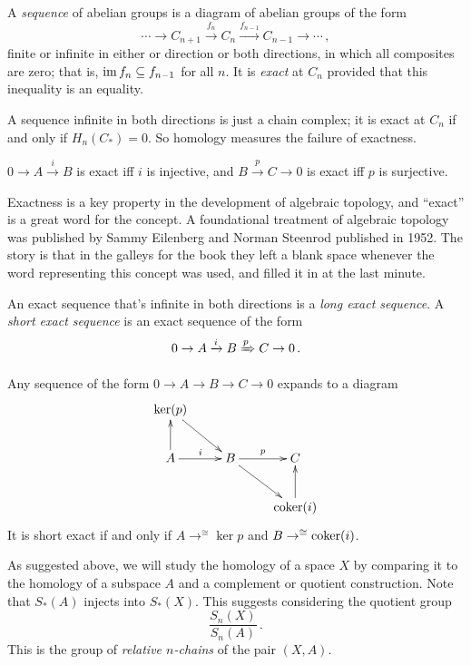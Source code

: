 \begin{definition}
A {\em sequence} of abelian groups is a diagram of abelian groups of the form 
\[
\cdots\rightarrow C_{n+1}\xrightarrow{f_n}C_n\xrightarrow{f_{n-1}}C_{n-1}
\rightarrow\cdots\,,
\]
finite or infinite in either or direction or both directions, in which all composites are zero; that is, $\operatorname{im} f_n\subseteq f_{n-1}$ for all $n$. It is 
{\em exact} at $C_n$ provided that this inequality is an equality. 
\end{definition}
\begin{example}
A sequence infinite in both directions is just a chain complex; it is exact at 
$C_n$ if and only if $H_n(C_\ast)=0$. So homology measures the failure of exactness.
\end{example}
\begin{example}
$0\to A\xrightarrow{i}B$ is exact iff $i$ is injective, and $B\xrightarrow{p}C\to 0$ is exact iff $p$ is surjective.
\end{example}
Exactness is a key property in the development of algebraic topology, and ``exact'' is a great word for the concept. A foundational treatment of algebraic topology was published by Sammy Eilenberg and Norman Steenrod published in 1952.
The story is that in the galleys for the book they left a blank space whenever the word representing this concept was used, and filled it in at the last minute. 
\begin{definition}
An exact sequence that's infinite in both directions
is a {\em long exact sequence}.
A {\em short exact sequence} is an exact sequence of the form 
\[
0\to A\xrightarrow{i}B\xRightarrow{p} C\to 0\,.
\]
\end{definition}

Any sequence of the form $0\to A\to B\to C\to0$ expands to a diagram
	\begin{equation*}
	\xymatrix{\ker(p) \ar[dr] & & \\
	A\ar[u]\ar[r]^i & B\ar[r]^p\ar[dr] & C\\
	 & & \coker(i)\ar[u]}
	\end{equation*}
It is short exact if and only if $A\rightarrow^{\cong}\ker p$ and 
$B\rightarrow^{\cong}\operatorname{coker}(i)$. 

As suggested above, we will study the homology of a space $X$ by comparing it to the homology of a subspace $A$ and a complement or quotient construction. 
Note that $S_*(A)$ injects into $S_*(X)$. This suggests considering the quotient group
\[
\frac{S_n(X)}{S_n(A)}\,.
\]
This is the group of {\em relative $n$-chains} of the pair $(X,A)$. 

